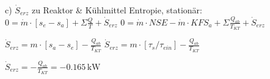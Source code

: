c) \( \dot{S}_{erz} \) zu Reaktor & Kühlmittel  
Entropie, stationär: \( 0 = \dot{m} \cdot [s_e - s_a] + \Sigma \frac{Q}{T} + \dot{S}_{erz} \)  
\( 0 = \dot{m} \cdot NSE - \dot{m} \cdot KFS_a + \Sigma \frac{Q_{ab}}{T_{KT}} + \dot{S}_{erz} \)  

\( \dot{S}_{erz} = m \cdot [s_a - s_e] - \frac{Q_{ab}}{T_{KT}} \)  
\( \dot{S}_{erz} = m \cdot [\tau_s / \tau_{ein}] - \frac{Q_{ab}}{T_{KT}} \)  

\( \dot{S}_{erz} = -\frac{Q_{ab}}{T_{KT}} = -0.165 \, \text{kW} \)